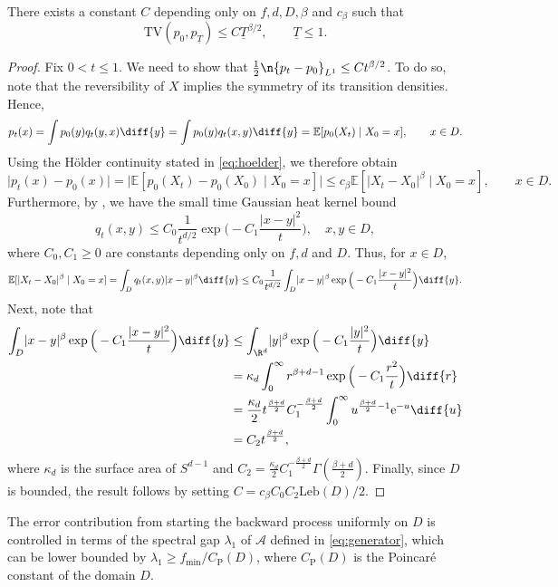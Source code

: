 \documentclass[a4paper, 11pt, headings = small, abstract]{scrartcl}
\begin{document}
\begin{lemma}\label{lem:early_stop}
There exists a constant $C$ depending only on $f, d, D, \beta$ and $c_\beta$ such that
	\[
		\mathrm{TV}(p_0, p_{\underline{T}})
		\le C\underline{T}^{\beta/2},\qquad \underline{T}\le 1.
	\]
\end{lemma}
\begin{proof}
Fix $0<t\le 1$.
We need to show that $\tfrac{1}{2}\n{p_t-p_0}_{L^1}\le Ct^{\beta/2}$.
To do so, note that the reversibility of $X$ implies the symmetry of its transition densities. Hence,
\[
p_t(x)=\int p_0(y)q_t(y, x)\diff{y}
		=\int p_0(y)q_t(x, y)\diff{y}
		=\mathbb{E}[p_0(X_t)\mid X_0=x],\qquad x\in D.
  \]
Using the Hölder continuity stated in \eqref{eq:hoelder}, we therefore obtain
\[
		\lvert p_t(x)-p_0(x)\rvert
		=\lvert\mathbb{E}[p_0(X_t)-p_0(X_0)\mid X_0=x]\rvert
		\le c_\beta \mathbb{E}[\lvert X_t-X_0\rvert^\beta\mid X_0=x],\qquad x\in D.
\]
Furthermore, by \cite[Corollary 3.2.9]{davies89}, we have the small time Gaussian heat kernel bound
\[
q_t(x, y)\le C_0\frac{1}{t^{d/2}}\exp\Big(-C_1\frac{|x-y|^2}{t}\Big),
\quad x,y\in D,
\]
where $C_0, C_1\ge0$ are constants depending only on $f, d$ and $D$.
Thus, for $x\in D$,
\[
		\mathbb{E}[\lvert X_t-X_0\rvert^\beta\mid X_0=x]
		=\int_Dq_t(x, y)\lvert x-y\rvert^\beta\diff{y}
		\le C_0\frac{1}{t^{d/2}}\int_D\lvert x-y\rvert^\beta \exp\Big(-C_1\frac{\lvert x-y \rvert^2}{t}\Big)\diff{y}.
\]
Next, note that
	\begin{align*}
		\int_D\lvert x-y\rvert^\beta \exp\Big(-C_1\frac{\lvert x-y\rvert^2}{t}\Big)\diff{y}
		&\le\int_{\R^d}\lvert y\rvert^\beta\exp\Big(-C_1\frac{\lvert y\rvert^2}{t}\Big)\diff{y} \\
		&=\kappa_d\int_{0}^{\infty}r^{\beta + d -1}\exp\Big(-C_1\frac{r^2}{t}\Big)\diff{r} \\
		&=\frac{\kappa_d}{2}t^{\frac{\beta + d}{2}}C_1^{-\frac{\beta+d}{2}}\int_{0}^{\infty}u^{\frac{\beta + d }{2}-1}\mathrm{e}^{-u}\diff{u} \\
		&=C_2t^{\frac{\beta + d}{2}},
	\end{align*}
	where $\kappa_d$ is the surface area of $S^{d-1}$ and $C_2=\frac{\kappa_d}{2}C_1^{-\frac{\beta+d}{2}}\Gamma(\frac{\beta + d}{2})$.
	Finally, since $D$ is bounded, the result follows by setting $C=c_\beta C_0C_2 \mathrm{Leb}(D)/2$.
\end{proof}

The error contribution from starting the backward process uniformly on $D$ is controlled in terms of the spectral gap $\lambda_1$ of $\mathcal{A}$ defined in \eqref{eq:generator}, which can be lower bounded by $\lambda_1 \geq f_{\min}/C_{\text{P}}(D)$, where $C_{\text{P}}(D)$ is the Poincaré constant of the domain $D$.
\end{document}
